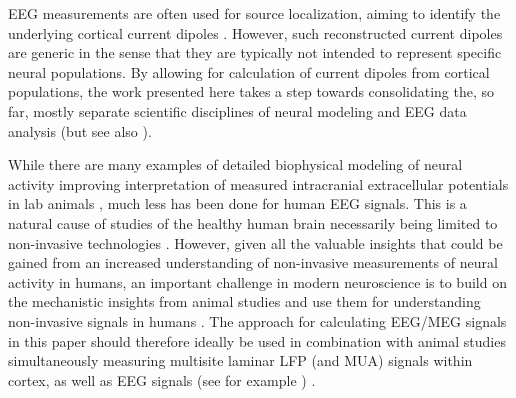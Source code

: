 \documentclass[preprint,10pt,authoryear]{elsarticle}
\begin{document}
EEG measurements are often used for source localization, aiming to identify the underlying cortical current dipoles \citep{NUNEZ2006, Gramfort2014, Ilmoniemi2019}. However, such reconstructed current dipoles are generic in the sense that they are typically not intended to represent specific neural populations. By allowing for calculation of current dipoles from cortical populations, the work presented here takes a step towards consolidating the, so far, mostly separate scientific disciplines of neural modeling and EEG data analysis (but see also \cite{NEYMOTIN2020}).

While there are many examples of detailed biophysical modeling of neural activity improving interpretation of measured intracranial extracellular potentials in lab animals \citep{Einevoll2007, Blomquist2009, McColgan2017, Luo2018, Chatzikalymniou2018, Telenczuk2019}, much less has been done for human EEG signals. This is a natural cause of studies of the healthy human brain necessarily being limited to non-invasive technologies \citep{SILVA2013, Uhlirova2016, COHEN2017}.
However, given all the valuable insights that could be gained from an increased understanding of non-invasive measurements of neural activity in humans, an important challenge in modern neuroscience is to build on the mechanistic insights from animal studies and use them for understanding non-invasive signals in humans \citep{SILVA2013, Uhlirova2016, COHEN2017, EINEVOLL2019, MAKI2019}.
The approach for calculating EEG/MEG signals in this paper should therefore ideally be used in combination with animal studies simultaneously measuring multisite laminar LFP (and MUA) signals within cortex, as well as EEG signals (see for example \cite{BRUYNS2017}) \citep{COHEN2017}.
\end{document}
